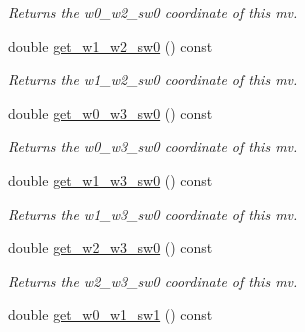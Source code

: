 \begin{DoxyCompactItemize}
\begin{DoxyCompactList}\small\item\em Returns the w0\-\_\-w2\-\_\-sw0 coordinate of this mv. \end{DoxyCompactList}\item 
\hypertarget{classe3ga_1_1mv_adf794512fb06bf374b081349ad61f663}{double \hyperlink{classe3ga_1_1mv_adf794512fb06bf374b081349ad61f663}{get\-\_\-w1\-\_\-w2\-\_\-sw0} () const }\label{classe3ga_1_1mv_adf794512fb06bf374b081349ad61f663}

\begin{DoxyCompactList}\small\item\em Returns the w1\-\_\-w2\-\_\-sw0 coordinate of this mv. \end{DoxyCompactList}\item 
\hypertarget{classe3ga_1_1mv_ae236ed83f3d02bf049850723c80f0775}{double \hyperlink{classe3ga_1_1mv_ae236ed83f3d02bf049850723c80f0775}{get\-\_\-w0\-\_\-w3\-\_\-sw0} () const }\label{classe3ga_1_1mv_ae236ed83f3d02bf049850723c80f0775}

\begin{DoxyCompactList}\small\item\em Returns the w0\-\_\-w3\-\_\-sw0 coordinate of this mv. \end{DoxyCompactList}\item 
\hypertarget{classe3ga_1_1mv_a9855e101e5bfa4cca7ec92e96d135171}{double \hyperlink{classe3ga_1_1mv_a9855e101e5bfa4cca7ec92e96d135171}{get\-\_\-w1\-\_\-w3\-\_\-sw0} () const }\label{classe3ga_1_1mv_a9855e101e5bfa4cca7ec92e96d135171}

\begin{DoxyCompactList}\small\item\em Returns the w1\-\_\-w3\-\_\-sw0 coordinate of this mv. \end{DoxyCompactList}\item 
\hypertarget{classe3ga_1_1mv_a26c83d52ba2475309350d08ed56f4e6e}{double \hyperlink{classe3ga_1_1mv_a26c83d52ba2475309350d08ed56f4e6e}{get\-\_\-w2\-\_\-w3\-\_\-sw0} () const }\label{classe3ga_1_1mv_a26c83d52ba2475309350d08ed56f4e6e}

\begin{DoxyCompactList}\small\item\em Returns the w2\-\_\-w3\-\_\-sw0 coordinate of this mv. \end{DoxyCompactList}\item 
\hypertarget{classe3ga_1_1mv_ac74de6fc7aae08dfadf9e05b77008e8d}{double \hyperlink{classe3ga_1_1mv_ac74de6fc7aae08dfadf9e05b77008e8d}{get\-\_\-w0\-\_\-w1\-\_\-sw1} () const }\label{classe3ga_1_1mv_ac74de6fc7aae08dfadf9e05b77008e8d}


\end{DoxyCompactItemize}
